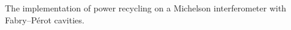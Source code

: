 The implementation of power recycling on a
    Michelson interferometer with Fabry--P\'{e}rot cavities.
